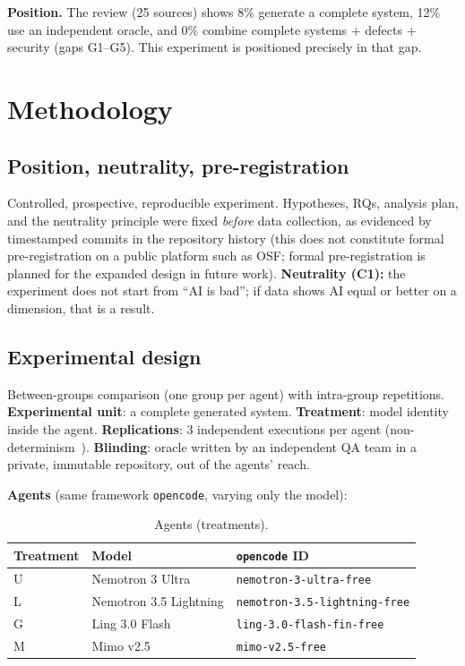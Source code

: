 \documentclass[10pt,twocolumn]{article}
\begin{document}
\textbf{Position.} The review (25 sources) shows 8\% generate a complete system, 12\% use an independent oracle, and 0\% combine complete systems $+$ defects $+$ security (gaps G1--G5). This experiment is positioned precisely in that gap.

\section{Methodology}

\subsection{Position, neutrality, pre-registration}

Controlled, prospective, reproducible experiment. Hypotheses, RQs, analysis plan, and the neutrality principle were fixed \emph{before} data collection, as evidenced by timestamped commits in the repository history (this does not constitute formal pre-registration on a public platform such as OSF; formal pre-registration is planned for the expanded design in future work). \textbf{Neutrality (C1):} the experiment does not start from ``AI is bad''; if data shows AI equal or better on a dimension, that is a result.

\subsection{Experimental design}

Between-groups comparison (one group per agent) with intra-group repetitions. \textbf{Experimental unit}: a complete generated system. \textbf{Treatment}: model identity inside the agent. \textbf{Replications}: 3 independent executions per agent (non-determinism~\cite{B04}). \textbf{Blinding}: oracle written by an independent QA team in a private, immutable repository, out of the agents' reach.

\textbf{Agents} (same framework \texttt{opencode}, varying only the model):

\begin{table}[t]
\caption{Agents (treatments).}
\label{tab:agents}
\small
\begin{tabularx}{\columnwidth}{@{}l l X@{}}
\toprule
\textbf{Treatment} & \textbf{Model} & \textbf{\texttt{opencode} ID}\\
\midrule
U & Nemotron 3 Ultra & \texttt{nemotron-3-ultra-free}\\
L & Nemotron 3.5 Lightning & \texttt{nemotron-3.5-lightning-free}\\
G & Ling 3.0 Flash & \texttt{ling-3.0-flash-fin-free}\\
M & Mimo v2.5 & \texttt{mimo-v2.5-free}\\
\bottomrule
\end{tabularx}
\end{table}
\end{document}
